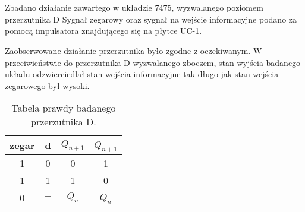 \section{}
Zbadano działanie zawartego w układzie 7475, wyzwalanego poziomem przerzutnika D
Sygnał zegarowy oraz sygnał na wejście informacyjne podano za pomocą impulsatora znajdującego się na płytce UC-1.

Zaobserwowane działanie przerzutnika było zgodne z oczekiwanym. W przeciwieństwie do przerzutnika D wyzwalanego zboczem, stan wyjścia badanego układu odzwierciedlał stan wejścia informacyjne tak długo jak stan wejścia zegarowego był wysoki.

\begin{table}[H]
    \centering
    \begin{tabular}{c|c||c|c}
        \hline
        zegar & d     & \(Q_{n+1}\) & \(\overline{Q_{n+1}}\)
        \\ \hline\hline
        1     & 0     & 0           & 1                      \\ \hline
        1     & 1     & 1           & 0                      \\ \hline
        0     & \(-\) & \(Q_n\)     & \(\overline{Q_n}\)     \\ \hline
    \end{tabular}
    \caption{Tabela prawdy badanego przerzutnika D.}
\end{table}